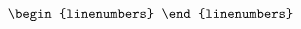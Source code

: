 \documentclass[10pt]{article}
\begin{document}
\[\begin{linenumbers}


\end{linenumbers}\]
\end{document}
